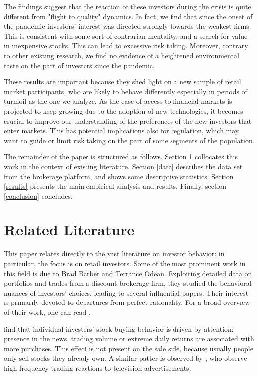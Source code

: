 \documentclass[12pt]{article}
\numberwithin{equation}{section} %
\begin{document}
The findings suggest that the reaction of these investors during the crisis is quite different from "flight to quality" dynamics. In fact, we find that since the onset of the pandemic investors' interest was directed strongly towards the weakest firms. This is consistent with some sort of contrarian mentality, and a search for value in inexpensive stocks. This can lead to excessive risk taking. Moreover, contrary to other existing research, we find no evidence of a heightened environmental taste on the part of investors since the pandemic.

These results are important because they shed light on a new sample of retail market participants, who are likely to behave differently especially in periods of turmoil as the one we analyze. As the ease of access to financial markets is projected to keep growing due to the adoption of new technologies, it becomes crucial to improve our understanding of the preferences of the new investors that enter markets. This has potential implications also for regulation, which may want to guide or limit risk taking on the part of some segments of the population.

The remainder of the paper is structured as follows. Section \ref{literature} collocates this work in the context of existing literature. Section \ref{data} describes the data set from the brokerage platform, and shows some descriptive statistics. Section \ref{results} presents the main empirical analysis and results. Finally, section \ref{conclusion} concludes.


\section{Related Literature} \label{literature}

This paper relates directly to the vast literature on investor behavior: in particular, the focus is on retail investors. Some of the most prominent work in this field is due to Brad Barber and Terrance Odean. Exploiting detailed data on portfolios and trades from a discount brokerage firm, they studied the behavioral nuances of investors' choices, leading to several influential papers. Their interest is primarily devoted to departures from perfect rationality. For a broad overview of their work, one can read \cite{Barber_2013}.

\cite{Barber_2007} find that individual investors' stock buying behavior is driven by attention: presence in the news, trading volume or extreme daily returns are associated with more purchases. This effect is not present on the sale side, because usually people only sell stocks they already own. A similar patter is observed by \cite{Liaukonyte_2019}, who observe high frequency trading reactions to television advertisements. 
\end{document}
